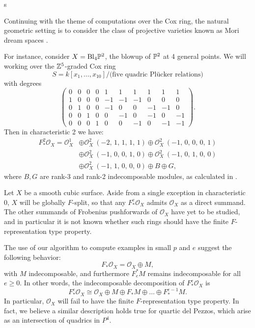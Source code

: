 s\documentclass{article}
\def\O{\mathcal O}
\numberwithin{equation}{section}
\theoremstyle{theorem}
\numberwithin{thm}{section}
\theoremstyle{definition}
\begin{document}
\begin{exa}
  Continuing with the theme of computations over the Cox ring, the natural geometric setting is to consider the class of projective varieties known as Mori dream spaces \cite{HK00}.

  For instance, consider $X = \mathrm{Bl}_4\P^2$, the blowup of $\P^2$ at 4 general points. We will working over the $\Z^5$-graded Cox ring
  \[ S = k[x_1,\dots,x_{10}]/\text{(five quadric Pl\"ucker relations)} \]
  with degrees
    \[
    \left(\!\begin{array}{rrrrrrrrrr}
      0&0&0&0&1&1&1&1&1&1 \\
      1&0&0&0&-1&-1&-1&0&0&0 \\
      0&1&0&0&-1&0&0&-1&-1&0 \\
      0&0&1&0&0&-1&0&-1&0&-1 \\
      0&0&0&1&0&0&-1&0&-1&-1
    \end{array}\!\right).
    \]
    Then in characteristic 2 we have:
    \begin{align*}
      F_*^2\O_X = {\O_{X}^{1}}
      &\oplus {\O_{X}^{2}\ \left(-2,\,1,\,1,\,1,\,1\right)} \oplus {\O_{X}^{2}\ \left(-1,\,0,\,0,\,0,\,1\right)} \\
      &\oplus {\O_{X}^{2}\ \left(-1,\,0,\,0,\,1,\,0\right)} \oplus {\O_{X}^{2}\ \left(-1,\,0,\,1,\,0,\,0\right)} \\
      &\oplus {\O_{X}^{2}\ \left(-1,\,1,\,0,\,0,\,0\right)} \oplus B \oplus G,
    \end{align*}
    where $B, G$ are rank-3 and rank-2 indecomposable modules, as calculated in \cite{Hara15}.
\end{exa}

\begin{exa}
  Let $X$ be a smooth cubic surface. Aside from a single exception in characteristic 0, $X$ will be globally $F$-split, so that any $F^e_*\O_X $ admits $\O_X$ as a direct summand.
  The other summands of Frobenius pushforwards of $\O_X$ have yet to be studied, and in particular it is not known whether such rings should have the finite $F$-representation type property.

  The use of our algorithm to compute examples in small $p$ and $e$ suggest the following behavior: 
  $$ F_* \O_X = \O_X\oplus M, $$
  with $M$ indecomposable, and furthermore $F^*_e M$ remains indecomposable for all $e\geq 0$. In other words, the indecomposable decomposition of $F^e_* \O_X$ is 
  $$ F_*^e \O_X \cong \O_X\oplus M\oplus F_* M\oplus\dots\oplus F_*^{e-1}M. $$
  In particular, $\O_X$ will fail to have the finite $F$-representation type property.
  In fact, we believe a similar description holds true for quartic del Pezzos, which arise as an intersection of quadrics in $P^4$.
\end{exa}
\end{document}
